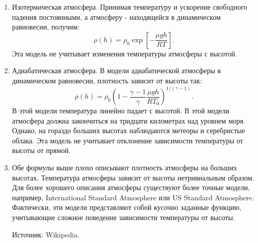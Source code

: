 \documentclass[a4paper,14pt]{article}
\begin{document}
\begin{enumerate}
    \item Изотермическая атмосфера.
    Принимая температуру и ускорение свободного падения постоянными, а атмосферу - находящейся в динамическом равновесии, получим:
    $$\rho (h) = \rho_0 \exp\left[-\frac{\mu g h}{RT}\right].$$
    Эта модель не учитывает изменения температуры атмосферы с высотой.
    
    \item Адиабатическая атмосфера.
    В модели адиабатической атмосферы в динамическом равновесии, плотность зависит от высоты так:
    $$\rho (h) = \rho_0 \left(1 - \frac{\gamma - 1}{\gamma} \frac{\mu g h}{R T_0}\right)^{1/(\gamma - 1)}.$$
    В этой модели температура линейно падает с высотой. В этой модели атмосфера должна закончиться на тридцати километрах над уровнем моря. Однако, на гораздо больших высотах наблюдаются метеоры и серебристые облака. Эта модель не учитывает отклонение зависимости температуры от высоты от прямой.
    
    \item Обе формулы выше плохо описывают плотность атмосферы на больших высотах. Температура атмосферы зависит от высоты нетривиальным образом. Для более хорошего описания атмосферы существуют более точные модели, например, International Standard Atmosphere или US Standard Atmosphere. Фактически, эти модели представляют собой кусочно заданные функцию, учитывающие сложное поведение зависимости температуры от высоты.
    
    Источник: Wikipedia.
\end{enumerate}
\end{document}
